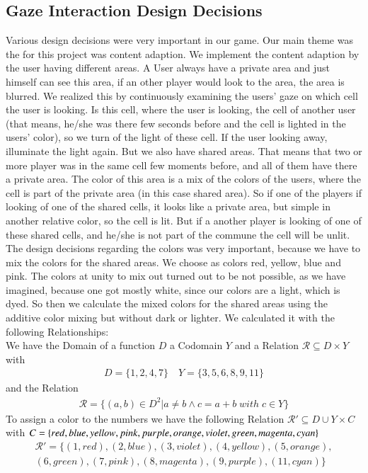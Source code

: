 \documentclass{sigchi}
\begin{document}
\subsection{Gaze Interaction Design Decisions}
Various design decisions were very important in our game. Our main theme was the for this project was content adaption. We implement the content adaption by the user having different areas. A User always have a private area and just himself can see this area, if an other player would look to the area, the area is blurred. We realized this by continuously examining the users' gaze on which cell the user is looking. Is this cell, where the user is looking, the cell of another user (that means, he/she was there few seconds before and the cell is lighted in the users' color), so we turn of the light of these cell. If the user looking away, illuminate the light again. But we also have shared areas. That means that two or more player was in the same cell few moments before, and all of them have there a private area. The color of this area is a mix of the colors of the users, where the cell is part of the private area (in this case shared area). So if one of the players if looking of one of the shared cells, it looks like a private area, but simple in another relative color, so the cell is lit. But if a another player is looking of one of these shared cells, and he/she is not part of the commune the cell will be unlit.\\ 
The design decisions regarding the colors was very important, because we have to mix the colors for the shared areas. We choose as colors red, yellow, blue and pink. The colors at unity to mix out turned out to be not possible, as we have imagined, because one got mostly white, since our colors are a light, which is dyed. So then we calculate the mixed colors for the shared areas using the additive color mixing but without dark or lighter. We calculated it with the following Relationships: \\
We have the Domain of a function $D$ a Codomain $Y$ and a Relation $\mathcal{R} \subseteq D \times Y$ with 
\begin{align*} D = \{1,2,4,7\}   \quad Y = \{3,5,6,8,9,11\} \end{align*} and the Relation \begin{align*} \mathcal{R} = \{(a,b) \in  D^2 | a \neq b \wedge c=a+b \; with\; c \in Y \} \end{align*}
To assign a color to the numbers we have the following Relation $\mathcal{R}' \subseteq D \cup Y \times C$ with $ C= \{red, blue, yellow, pink, purple, orange, violet, green, \\magenta, cyan\} $
\begin{align*} \mathcal{R}' = \{(1,red),(2,blue),(3,violet), (4,yellow), (5,orange), \\ (6,green), (7,pink), (8,magenta), (9,purple), (11,cyan)\} \end{align*}
\end{document}
